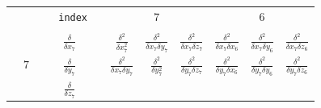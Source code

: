 \documentclass{article}
\begin{document}
\begin{figure}[htb]
\begin{center}

\begin{tabular}{c|c|cc|c|cc|ccc|ccc|}

\cline{8-13}

\multicolumn{6}{r}{\texttt{index}} & &
& $7$ & &
& $6$ & \\

\cline{8-13}

\multicolumn{13}{c}{ }

\\

\cline{2-2}
\cline{5-5}
\cline{8-13}

\hspace{0.2cm} & & \hspace{0.2cm} & \hspace{0.2cm} &

$\frac{\delta}{\delta x_7}$ & \hspace{0.2cm} & \hspace{0.2cm} &

$\frac{\delta^2}{\delta x_7^2}         $ &
$\frac{\delta^2}{\delta x_7 \delta y_7}$ &
$\frac{\delta^2}{\delta x_7 \delta z_7}$ &

$\frac{\delta^2}{\delta x_7 \delta x_6}$ &
$\frac{\delta^2}{\delta x_7 \delta y_6}$ &
$\frac{\delta^2}{\delta x_7 \delta z_6}$ \\


\hspace{0.2cm} & $7$ & \hspace{0.2cm} & \hspace{0.2cm} &

$\frac{\delta}{\delta y_7}$ & \hspace{0.2cm} & \hspace{0.2cm} &

$\frac{\delta^2}{\delta x_7 \delta y_7}$ &
$\frac{\delta^2}{\delta y_7^2}         $ &
$\frac{\delta^2}{\delta y_7 \delta z_7}$ &

$\frac{\delta^2}{\delta y_7 \delta x_6}$ &
$\frac{\delta^2}{\delta y_7 \delta y_6}$ &
$\frac{\delta^2}{\delta y_7 \delta z_6}$ \\


\hspace{0.2cm} & & \hspace{0.2cm} & \hspace{0.2cm} &

$\frac{\delta}{\delta z_7}$ & \hspace{0.2cm} & \hspace{0.2cm} &


\end{tabular}
\end{center}
\end{figure}
\end{document}
